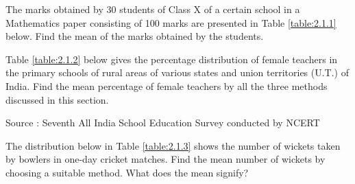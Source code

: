 \item The marks obtained by 30 students of Class X of a certain school in a Mathematics paper consisting of 100 marks are presented in Table \ref{table:2.1.1}
below. Find the mean of the marks obtained by the students.\\
\begin{table}[!ht]
\centering
	
\caption{}
\label{table:2.1.1}
\end{table}
\solution

\item Table \ref{table:2.1.2}
 below gives the percentage distribution of female teachers in the primary schools of rural areas of various states and union territories (U.T.) of India. Find the mean percentage of female teachers by all the three methods discussed
in this section.\\
\begin{table}[!ht]
\centering
	
\caption{}
Source : Seventh All India School Education Survey conducted by NCERT
\label{table:2.1.2}
\end{table}
\solution

\item The distribution below in Table \ref{table:2.1.3}
 shows the number of wickets taken by bowlers in one-day cricket matches. Find the mean number of wickets by choosing a suitable
method. What does the mean signify?
\begin{table}[!ht]
\centering
	
\caption{}
\label{table:2.1.3}
\end{table}
\\
\solution

